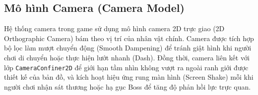 \documentclass[../DoAn.tex]{subfiles}
\begin{document}
\subsection{Mô hình Camera (Camera Model)}
\label{subsection:3.9.3}

Hệ thống camera trong game sử dụng mô hình camera 2D trực giao (2D Orthographic Camera) bám theo vị trí của nhân vật chính. Camera được tích hợp bộ lọc làm mượt chuyển động (Smooth Dampening) để tránh giật hình khi người chơi di chuyển hoặc thực hiện lướt nhanh (Dash). Đồng thời, camera liên kết với lớp \texttt{CameraConfiner2D} để giới hạn tầm nhìn không vượt ra ngoài ranh giới được thiết kế của bản đồ, và kích hoạt hiệu ứng rung màn hình (Screen Shake) mỗi khi người chơi nhận sát thương hoặc hạ gục Boss để tăng độ phản hồi lực trực quan.
\end{document}

